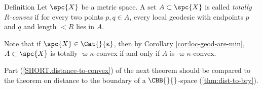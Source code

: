 \begin{thm}{Definition} 
\label{def:convex-set}
Let $\spc{X}$ be a metric space. 
A set $A\subset\spc{X}$ is called 
\emph{totally $R$-convex}%
if for every two points $p,q\in A$, every local geodesic with endpoints $p$ and $q$ and length $< R$  lies in $A$.
\end{thm}

Note that if $\spc{X}\in\Cat{}{\kappa}$, then by Corollary \ref{cor:loc-geod-are-min},  $A\subset\spc{X}$ is totally $\varpi\kappa$-convex if and only if $A$ is $\varpi\kappa$-convex.


Part (\ref{SHORT.distance-to-convex}) of  the next theorem should be compared to the theorem on distance to the boundary of a $\CBB{}{}$-space (\ref{thm:dist-to-bry}).





